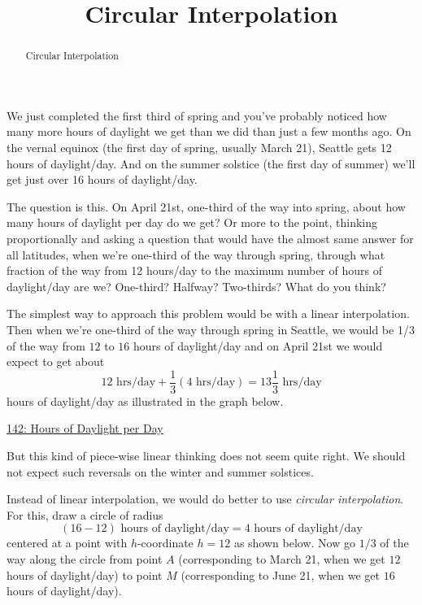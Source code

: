 \documentclass{ximera}
\title{Circular Interpolation}
\begin{document}
\begin{abstract}
Circular Interpolation
\end{abstract}
\maketitle


We just completed the first third of spring and you've probably noticed how many more hours of daylight we get than we did than just a few months ago. On the vernal equinox (the first day of spring, usually March 21), Seattle gets 12 hours of daylight/day. And on the summer solstice (the first day of summer) we'll get just over 16 hours of daylight/day. 

The question is this. On April 21st, one-third of the way into spring, about how many hours of daylight per day do we get? Or more to the point, thinking proportionally and asking a question that would have the almost same answer for all latitudes, when we're one-third of the way through spring, through what fraction of the way from 12 hours/day to the maximum number of hours of daylight/day are we? One-third? Halfway? Two-thirds? What do you think?

The simplest way to approach this problem would be with a linear interpolation. Then when we're one-third of the way through spring in Seattle, we would be 1/3 of the way from $12$ to $16$ hours of daylight/day and on April 21st we would expect to get about
\[
    12 \text{ hrs/day} + \frac{1}{3}(4 \text{ hrs/day}) = 13 \frac{1}{3}\text{ hrs/day}
\]
hours of daylight/day as illustrated in the graph below.


\begin{onlineOnly}
    \begin{center}
\end{center}
\end{onlineOnly}

\href{https://www.desmos.com/calculator/fvnsud82lx}{142: Hours of Daylight per Day}

But this kind of piece-wise linear thinking does not seem quite right. We should not expect such reversals on the winter and summer solstices.

Instead of linear interpolation, we would do better to use \emph{circular interpolation}. For this, draw a circle of radius 
\[
     (16 - 12) \text{ hours of daylight/day} = 4 \text{ hours of daylight/day}
\]
centered at a point with $h$-coordinate $h=12$ as shown below. Now go $1/3$ of the way along the circle from point $A$ (corresponding to March 21, when we get $12$ hours of daylight/day) to point $M$ (corresponding to June 21, when we get $16$ hours of daylight/day).
\end{document}
